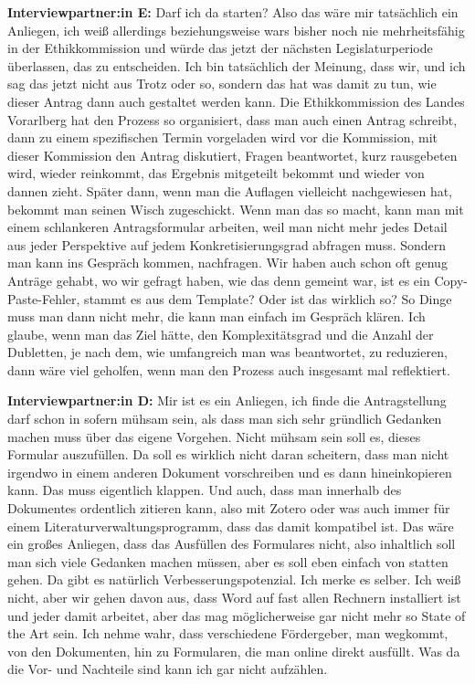 \documentclass[a4paper,12pt,twoside]{scrreprt}
\begin{document}
\textbf{Interviewpartner:in E:} Darf ich da starten? Also das wäre mir tatsächlich ein Anliegen, ich weiß allerdings beziehungsweise wars bisher noch nie mehrheitsfähig in der Ethikkommission und würde das jetzt der nächsten Legislaturperiode überlassen, das zu entscheiden. Ich bin tatsächlich der Meinung, dass wir, und ich sag das jetzt nicht aus Trotz oder so, sondern das hat was damit zu tun, wie dieser Antrag dann auch gestaltet werden kann. Die Ethikkommission des Landes Vorarlberg hat den Prozess so organisiert, dass man auch einen Antrag schreibt, dann zu einem spezifischen Termin vorgeladen wird vor die Kommission, mit dieser Kommission den Antrag diskutiert, Fragen beantwortet, kurz rausgebeten wird, wieder reinkommt, das Ergebnis mitgeteilt bekommt und wieder von dannen zieht. Später dann, wenn man die Auflagen vielleicht nachgewiesen hat, bekommt man seinen Wisch zugeschickt. Wenn man das so macht, kann man mit einem schlankeren Antragsformular arbeiten, weil man nicht mehr jedes Detail aus jeder Perspektive auf jedem Konkretisierungsgrad abfragen muss. Sondern man kann ins Gespräch kommen, nachfragen. Wir haben auch schon oft genug Anträge gehabt, wo wir gefragt haben, wie das denn gemeint war, ist es ein Copy-Paste-Fehler, stammt es aus dem Template? Oder ist das wirklich so? So Dinge muss man dann nicht mehr, die kann man einfach im Gespräch klären. Ich glaube, wenn man das Ziel hätte, den Komplexitätsgrad und die Anzahl der Dubletten, je nach dem, wie umfangreich man was beantwortet, zu reduzieren, dann wäre viel geholfen, wenn man den Prozess auch insgesamt mal reflektiert.

\textbf{Interviewpartner:in D:} Mir ist es ein Anliegen, ich finde die Antragstellung darf schon in sofern mühsam sein, als dass man sich sehr gründlich Gedanken machen muss über das eigene Vorgehen. Nicht mühsam sein soll es, dieses Formular auszufüllen. Da soll es wirklich nicht daran scheitern, dass man nicht irgendwo in einem anderen Dokument vorschreiben und es dann hineinkopieren kann. Das muss eigentlich klappen. Und auch, dass man innerhalb des Dokumentes ordentlich zitieren kann, also mit Zotero oder was auch immer für einem Literaturverwaltungsprogramm, dass das damit kompatibel ist. Das wäre ein großes Anliegen, dass das Ausfüllen des Formulares nicht, also inhaltlich soll man sich viele Gedanken machen müssen, aber es soll eben einfach von statten gehen. Da gibt es natürlich Verbesserungspotenzial. Ich merke es selber. Ich weiß nicht, aber wir gehen davon aus, dass Word auf fast allen Rechnern installiert ist und jeder damit arbeitet, aber das mag möglicherweise gar nicht mehr so State of the Art sein. Ich nehme wahr, dass verschiedene Fördergeber, man wegkommt, von den Dokumenten, hin zu Formularen, die man online direkt ausfüllt. Was da die Vor- und Nachteile sind kann ich gar nicht aufzählen.
\end{document}
